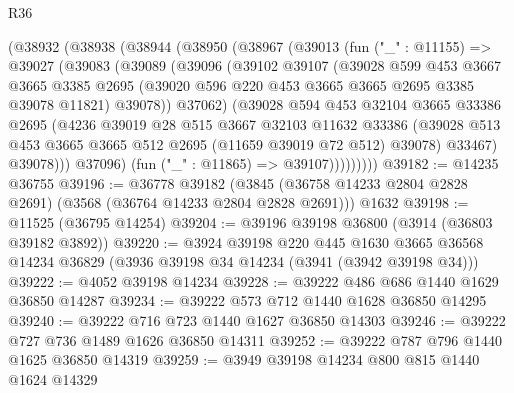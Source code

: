 \begin{lexlean}{R36}
\begin{coremodule}
        (@38932
          (@38938
            (@38944
              (@38950
                (@38967
                  (@39013
                    (fun ("_" : @11155) =>
                    @39027
                      (@39083
                        (@39089
                          (@39096
                            (@39102
                              @39107
                              (@39028
                                @599
                                @453
                                @3667
                                @3665
                                @3385
                                @2695
                                (@39020 @596 @220 @453 @3665 @3665 @2695 @3385 @39078 @11821)
                                @39078))
                            @37062)
                          (@39028
                            @594
                            @453
                            @32104
                            @3665
                            @33386
                            @2695
                            (@4236
                              @39019
                              @28
                              @515
                              @3667
                              @32103
                              @11632
                              @33386
                              (@39028
                                @513
                                @453
                                @3665
                                @3665
                                @512
                                @2695
                                (@11659 @39019 @72 @512)
                                @39078)
                              @33467)
                            @39078)))
                      @37096)
                    (fun ("_" : @11865) => @39107)))))))))
@39182 := @14235 @36755
@39196 := @36778
    @39182
    (@3845 (@36758 @14233 @2804 @2828 @2691) (@3568 (@36764 @14233 @2804 @2828 @2691)))
    @1632
@39198 := @11525 (@36795 @14254)
@39204 := @39196 @39198 @36800 (@3914 (@36803 @39182 @3892))
@39220 := @3924
    @39198
    @220
    @445
    @1630
    @3665
    @36568
    @14234
    @36829
    (@3936 @39198 @34 @14234 (@3941 (@3942 @39198 @34)))
@39222 := @4052 @39198 @14234
@39228 := @39222 @486 @686 @1440 @1629 @36850 @14287
@39234 := @39222 @573 @712 @1440 @1628 @36850 @14295
@39240 := @39222 @716 @723 @1440 @1627 @36850 @14303
@39246 := @39222 @727 @736 @1489 @1626 @36850 @14311
@39252 := @39222 @787 @796 @1440 @1625 @36850 @14319
@39259 := @3949 @39198 @14234 @800 @815 @1440 @1624 @14329

\end{coremodule}
\end{lexlean}
